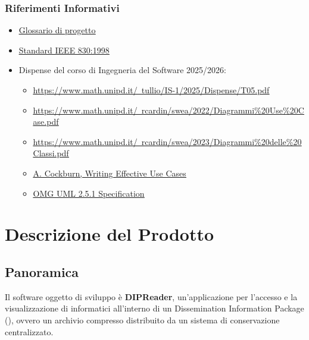 \subsubsection{Riferimenti Informativi}
\begin{itemize}
    \item \href{https://cdn.jsdelivr.net/gh/7-zpus/Docs@main/2_RTB/Glossario.pdf}{\ul{Glossario di progetto}} 
    \item \href{https://ieeexplore.ieee.org/document/720574}{\ul{Standard IEEE 830:1998}} 
    \item Dispense del corso di Ingegneria del Software 2025/2026:
    \begin{itemize}
        \item \href{https://www.math.unipd.it/~tullio/IS-1/2025/Dispense/T05.pdf}{\ul{https://www.math.unipd.it/~tullio/IS-1/2025/Dispense/T05.pdf}} 
        \item \href{https://www.math.unipd.it/~rcardin/swea/2022/Diagrammi%20Use%20Case.pdf}{\ul{https://www.math.unipd.it/~rcardin/swea/2022/Diagrammi\%20Use\%20Case.pdf}\setulcolor{black}} 
        \item \href{https://www.math.unipd.it/~rcardin/swea/2023/Diagrammi%20delle%20Classi.pdf}{\ul{https://www.math.unipd.it/~rcardin/swea/2023/Diagrammi\%20delle\%20Classi.pdf}\setulcolor{black}} 
        \item \href{https://kurzy.kpi.fei.tuke.sk/zsi/resources/CockburnBookDraft.pdf}{\ul{A. Cockburn, Writing Effective Use Cases}} 
        \item \href{https://www.omg.org/spec/UML/2.5.1/PDF}{\ul{OMG UML 2.5.1 Specification}} 
    \end{itemize}
\end{itemize}

\section{Descrizione del Prodotto}

\subsection{Panoramica}
Il software oggetto di sviluppo è \textbf{DIPReader}, un'applicazione per l'accesso e la visualizzazione di  informatici all'interno di un Dissemination Information Package (), ovvero un archivio compresso distribuito da un sistema di conservazione centralizzato. \\

